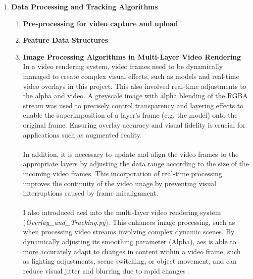 \documentclass[12pt]{article}
\begin{document}
\begin{enumerate}
      \item \textbf{Data Processing and Tracking Algorithms}
            \begin{enumerate}
                  \item \textbf{Pre-processing for video capture and upload}

                  \item \textbf{Feature Data Structures}

                  \item \textbf{Image Processing Algorithms in Multi-Layer Video Rendering}
                        \\ In a video rendering system, video frames need to be dynamically managed to create complex visual effects, such as models and real-time video overlays in this project. This also involved real-time adjustments to the \gls{alpha}\cite{Alpha} and video. A greyscale image with alpha blending of the RGBA stream was used to precisely control transparency and layering effects to enable the superimposition of a layer's frame (e.g. the model) onto the original frame\cite{9979846}. Ensuring overlay accuracy and visual fidelity is crucial for applications such as augmented reality\cite{SETTIMI2022104272}.
                        \\\\
                        In addition, it is necessary to update and align the video frames to the appropriate layers by adjusting the data range according to the size of the incoming video frames. This incorporation of real-time processing improves the continuity of the video image by preventing visual interruptions caused by frame misalignment\cite{Wang}.
                        \\\\
                        I also introduced \gls{aesl} into the multi-layer video rendering system (\emph{Overlay\_and\_Tracking.py}). This enhances image processing, such as when processing video streams involving complex dynamic scenes\cite{7410724}. By dynamically adjusting its smoothing parameter (Alpha), \gls{aes} is able to more accurately adapt to changes in content within a video frame, such as lighting adjustments, scene switching, or object movement, and can reduce visual jitter and blurring due to rapid changes \cite{7410724}.

\end{enumerate}
\end{enumerate}
\end{document}
